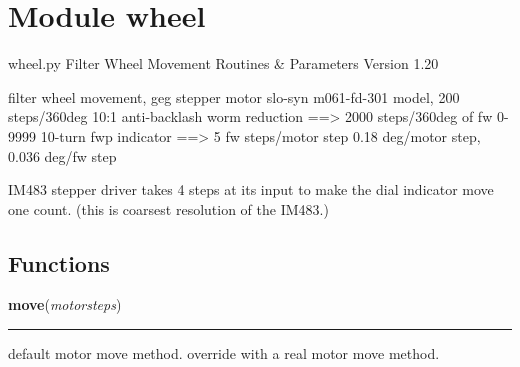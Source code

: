 %
%
%


\section{Module wheel}

    \label{wheel}
wheel.py  Filter Wheel Movement Routines \& Parameters   Version 1.20

filter wheel movement, geg stepper motor slo-syn m061-fd-301 model, 200 
steps/360deg 10:1 anti-backlash worm reduction =={\textgreater} 2000 
steps/360deg of fw 0-9999 10-turn fwp indicator =={\textgreater} 5 fw 
steps/motor step 0.18 deg/motor step, 0.036 deg/fw step

IM483 stepper driver takes 4 steps at its input to make the dial indicator 
move one count. (this is coarsest resolution of the IM483.)



  \subsection{Functions}

    \label{wheel:move}

    \vspace{0.5ex}

    \begin{boxedminipage}{\textwidth}

    \raggedright \textbf{move}(\textit{motorsteps})

    \vspace{-1.5ex}

    \rule{\textwidth}{0.5\fboxrule}
    default motor move method. override with a real motor move method.

    \vspace{1ex}

    \end{boxedminipage}

